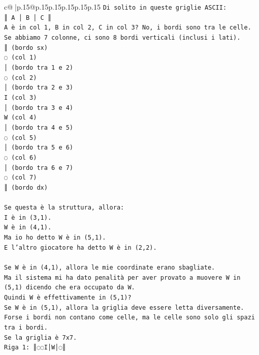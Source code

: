 \documentclass{article}
\begin{document}
{\begin{supertabular}{c@{$\;$}|p{.15\linewidth}@{}p{.15\linewidth}p{.15\linewidth}p{.15\linewidth}p{.15\linewidth}p{.15\linewidth}}
{{{\texttt{Di solito in queste griglie ASCII:} \\
\texttt{║ A │ B │ C ║} \\
\texttt{A è in col 1, B in col 2, C in col 3? No, i bordi sono tra le celle.} \\
\texttt{Se abbiamo 7 colonne, ci sono 8 bordi verticali (inclusi i lati).} \\
\texttt{║ (bordo sx)} \\
\texttt{◌ (col 1)} \\
\texttt{│ (bordo tra 1 e 2)} \\
\texttt{◌ (col 2)} \\
\texttt{│ (bordo tra 2 e 3)} \\
\texttt{I (col 3)} \\
\texttt{│ (bordo tra 3 e 4)} \\
\texttt{W (col 4)} \\
\texttt{│ (bordo tra 4 e 5)} \\
\texttt{◌ (col 5)} \\
\texttt{│ (bordo tra 5 e 6)} \\
\texttt{◌ (col 6)} \\
\texttt{│ (bordo tra 6 e 7)} \\
\texttt{◌ (col 7)} \\
\texttt{║ (bordo dx)} \\
\\ 
\texttt{Se questa è la struttura, allora:} \\
\texttt{I è in (3,1).} \\
\texttt{W è in (4,1).} \\
\texttt{Ma io ho detto W è in (5,1).} \\
\texttt{E l'altro giocatore ha detto W è in (2,2).} \\
\\ 
\texttt{Se W è in (4,1), allora le mie coordinate erano sbagliate.} \\
\texttt{Ma il sistema mi ha dato penalità per aver provato a muovere W in (5,1) dicendo che era occupato da W.} \\
\texttt{Quindi W è effettivamente in (5,1)?} \\
\texttt{Se W è in (5,1), allora la griglia deve essere letta diversamente.} \\
\texttt{Forse i bordi non contano come celle, ma le celle sono solo gli spazi tra i bordi.} \\
\texttt{Se la griglia è 7x7.} \\
\texttt{Riga 1: ║◌◌I│W│◌║} \\
}}}
\end{supertabular}}
\end{document}
